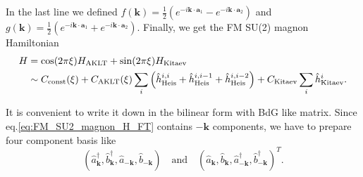 \documentclass[11pt, aps, longbibliography]{article}
\begin{document}
In the last line we defined $f(\bm{k}) = \frac{1}{2}\left( e^{-i\bm{k}\cdot\bm{a}_1} - e^{-i\bm{k}\cdot\bm{a}_2} \right)$ and $g(\bm{k}) = \frac{1}{2}\left( e^{-i\bm{k}\cdot\bm{a}_1} + e^{-i\bm{k}\cdot\bm{a}_2} \right)$.
Finally, we get the FM SU(2) magnon Hamiltonian
\begin{align}
    H &= \cos(2\pi \xi)H_{\rm AKLT} + \sin(2\pi \xi)H_{\rm Kitaev} \notag \\
    &\sim C_{\rm const}(\xi) + C_{\rm AKLT}(\xi)\sum_{i}\left( \hat{h}_{\rm Heis}^{i,i} + \hat{h}_{\rm Heis}^{i,i-1} + \hat{h}_{\rm Heis}^{i,i-2} \right) + C_{\rm Kitaev} \sum_{i} \hat{h}_{\rm Kitaev}^i. \label{eq:FM_SU2_magnon_H_FT}
\end{align}

It is convenient to write it down in the bilinear form with BdG like matrix.
Since eq.\eqref{eq:FM_SU2_magnon_H_FT} contains $-\bm{k}$ components, we have to prepare four component basis like
\begin{equation}
    \left( \hat{a}^\dagger_{\bm{k}}, \hat{b}^\dagger_{\bm{k}}, \hat{a}_{-\bm{k}}, \hat{b}_{-\bm{k}}\right) \quad \text{and} \quad \left( \hat{a}_{\bm{k}}, \hat{b}_{\bm{k}}, \hat{a}_{-\bm{k}}^\dagger, \hat{b}_{-\bm{k}}^\dagger\right)^T.
\end{equation}
\end{document}
